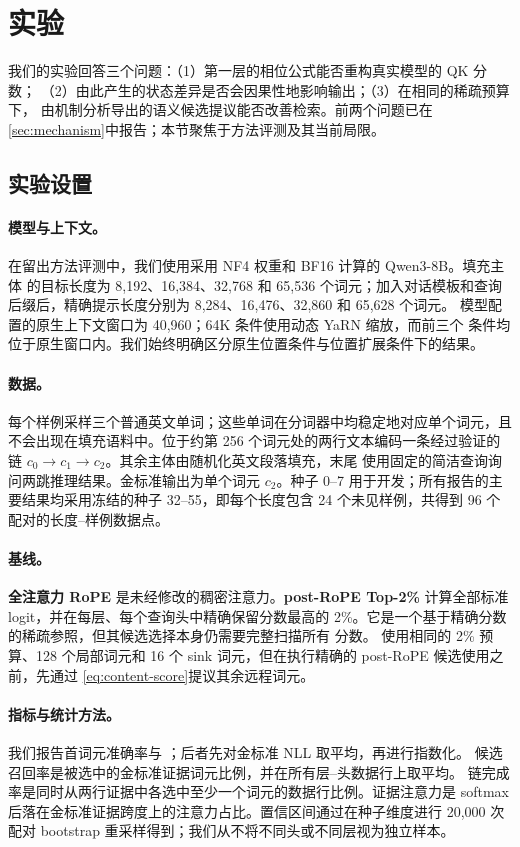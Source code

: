 \section{实验}
\label{sec:experiments}

我们的实验回答三个问题：（1）第一层的相位公式能否重构真实模型的 QK 分数；
（2）由此产生的状态差异是否会因果性地影响输出；（3）在相同的稀疏预算下，
由机制分析导出的语义候选提议能否改善检索。前两个问题已在
\cref{sec:mechanism}中报告；本节聚焦于方法评测及其当前局限。

\subsection{实验设置}

\paragraph{模型与上下文。}
在留出方法评测中，我们使用采用 NF4 权重和 BF16 计算的 Qwen3-8B。填充主体
的目标长度为 8,192、16,384、32,768 和 65,536 个词元；加入对话模板和查询
后缀后，精确提示长度分别为 8,284、16,476、32,860 和 65,628 个词元。
模型配置的原生上下文窗口为 40,960；64K 条件使用动态 YaRN 缩放，而前三个
条件均位于原生窗口内。我们始终明确区分原生位置条件与位置扩展条件下的结果。

\paragraph{数据。}
每个样例采样三个普通英文单词；这些单词在分词器中均稳定地对应单个词元，且
不会出现在填充语料中。位于约第 256 个词元处的两行文本编码一条经过验证的链
$c_0\rightarrow c_1\rightarrow c_2$。其余主体由随机化英文段落填充，末尾
使用固定的简洁查询询问两跳推理结果。金标准输出为单个词元 $c_2$。种子
0--7 用于开发；所有报告的主要结果均采用冻结的种子 32--55，即每个长度包含
24 个未见样例，共得到 96 个配对的长度--样例数据点。

\paragraph{基线。}
\textbf{全注意力 RoPE} 是未经修改的稠密注意力。\textbf{post-RoPE
Top-2\%} 计算全部标准 logit，并在每层、每个查询头中精确保留分数最高的
2\%。它是一个基于精确分数的稀疏参照，但其候选选择本身仍需要完整扫描所有
分数。\textbf{\methodpost} 使用相同的 2\% 预算、128 个局部词元和 16 个
sink 词元，但在执行精确的 post-RoPE 候选使用之前，先通过
\cref{eq:content-score}提议其余远程词元。

\paragraph{指标与统计方法。}
我们报告首词元准确率与 \GoldPPL；后者先对金标准 NLL 取平均，再进行指数化。
候选召回率是被选中的金标准证据词元比例，并在所有层--头数据行上取平均。
链完成率是同时从两行证据中各选中至少一个词元的数据行比例。证据注意力是
softmax 后落在金标准证据跨度上的注意力占比。置信区间通过在种子维度进行
20,000 次配对 bootstrap 重采样得到；我们从不将不同头或不同层视为独立样本。

